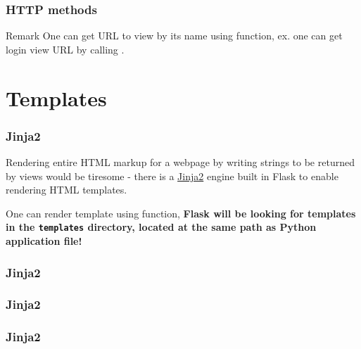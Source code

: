 \documentclass{beamer}
\begin{document}
\begin{frame}
  \frametitle{HTTP methods}

  \begin{block}{Remark}
    One can get URL to view by its name using  function, ex. one can get login view URL by calling
    .
  \end{block}
\end{frame}

\section{Templates}

\begin{frame}
  \frametitle{Jinja2}

  Rendering entire HTML markup for a webpage by writing strings to be returned by views would be tiresome - there
  is a \href{http://jinja.pocoo.org/}{Jinja2} engine built in Flask to enable rendering HTML templates.

  \vspace{3mm} \pause

  One can render template using  function, \textbf{Flask will be looking for templates
  in the \texttt{templates} directory, located at the same path as Python application file!}

\end{frame}

\begin{frame}
  \frametitle{Jinja2}
  \begin{figure}
    \caption{}
  \end{figure}

\end{frame}

\begin{frame}
  \frametitle{Jinja2}

  \begin{figure}
    
    \caption{}
  \end{figure}
\end{frame}

\begin{frame}
  \frametitle{Jinja2}
  \begin{figure}
    
    \caption{}

  \end{figure}

\end{frame}
\end{document}
